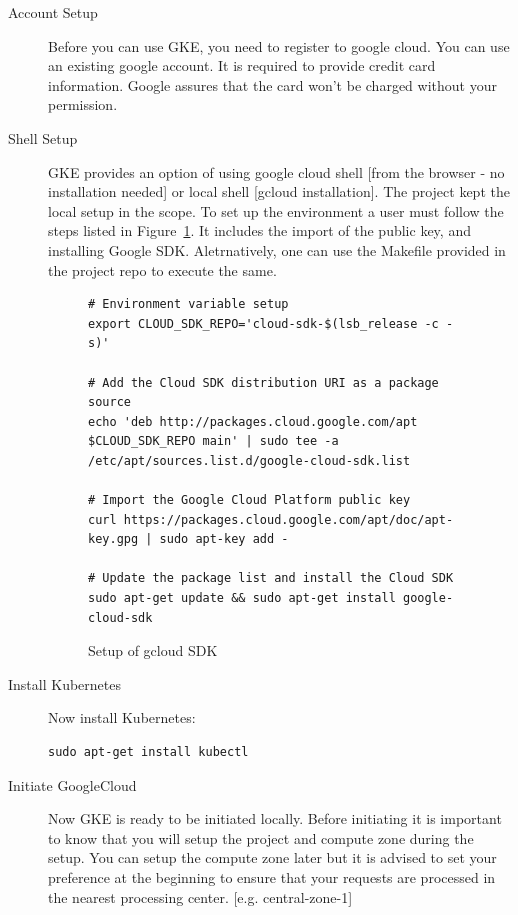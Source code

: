 \begin{description}

\item[Account Setup] Before you can use GKE, you need to register to google
  cloud. You can use an existing google account. It is required to provide
  credit card information.  Google assures that the card won't be charged
  without your permission.

\item[Shell Setup] GKE provides an option of using google cloud shell [from
  the browser - no installation needed] or local shell [gcloud installation].
  The project kept the local setup in the scope. To set up the environment a
  user must follow the steps listed in Figure~\ref{F:setup}. It includes the
  import of the public key, and installing Google SDK. Aletrnatively, one can
  use the Makefile provided in the project repo to execute the same.

\begin{figure}[htb]
\begin{footnotesize}
\begin{verbatim}
# Environment variable setup
export CLOUD_SDK_REPO='cloud-sdk-$(lsb_release -c -s)'

# Add the Cloud SDK distribution URI as a package source
echo 'deb http://packages.cloud.google.com/apt $CLOUD_SDK_REPO main' | sudo tee -a /etc/apt/sources.list.d/google-cloud-sdk.list

# Import the Google Cloud Platform public key
curl https://packages.cloud.google.com/apt/doc/apt-key.gpg | sudo apt-key add -

# Update the package list and install the Cloud SDK
sudo apt-get update && sudo apt-get install google-cloud-sdk
\end{verbatim}

\end{footnotesize}
\caption{Setup of gcloud SDK}\label{F:setup}
\end{figure}


\item[Install Kubernetes] Now install Kubernetes:

\begin{verbatim}
sudo apt-get install kubectl
\end{verbatim}

\item[Initiate GoogleCloud] Now GKE is ready to be initiated locally. Before
initiating it is important to know that you will setup the project and compute
zone during the setup. You can setup the compute zone later but it is advised
to set your preference at the beginning to ensure that your requests are
processed in the nearest processing center. [e.g. central-zone-1] 


\end{description}
